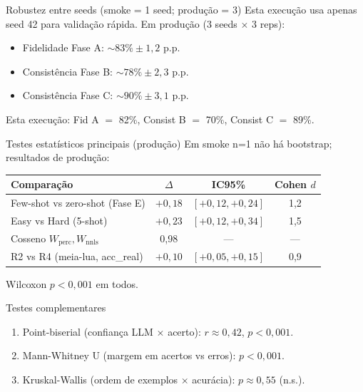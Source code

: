 \documentclass[aspectratio=169,10pt]{beamer}
\begin{document}
\begin{frame}{Robustez entre seeds (smoke = 1 seed; produ\c{c}\~ao = 3)}
  \scriptsize
  Esta execu\c{c}\~ao usa apenas seed 42 para valida\c{c}\~ao r\'apida. Em produ\c{c}\~ao (3 seeds $\times$ 3 reps):
  \begin{itemize}
    \item Fidelidade Fase A: $\sim 83\% \pm 1{,}2$ p.p.
    \item Consist\^encia Fase B: $\sim 78\% \pm 2{,}3$ p.p.
    \item Consist\^encia Fase C: $\sim 90\% \pm 3{,}1$ p.p.
  \end{itemize}
  \medskip

  Esta execu\c{c}\~ao: Fid A $=$ 82\%, Consist B $=$ 70\%, Consist C $=$ 89\%.
\end{frame}

\begin{frame}{Testes estat\'isticos principais (produ\c{c}\~ao)}
  \scriptsize
  Em smoke n=1 n\~ao h\'a bootstrap; resultados de produ\c{c}\~ao:
  \begin{center}
  \begin{tabular}{lccc}
    \toprule
    Compara\c{c}\~ao & $\Delta$ & IC95\% & Cohen $d$ \\
    \midrule
    Few-shot vs zero-shot (Fase E) & $+0{,}18$ & $[+0{,}12, +0{,}24]$ & 1{,}2 \\
    Easy vs Hard (5-shot)           & $+0{,}23$ & $[+0{,}12, +0{,}34]$ & 1{,}5 \\
    Cosseno $W_{\text{perc}}, W_{\text{nnls}}$ & 0{,}98 & --- & --- \\
    R2 vs R4 (meia-lua, acc\_real)   & $+0{,}10$ & $[+0{,}05, +0{,}15]$ & 0{,}9 \\
    \bottomrule
  \end{tabular}
  \end{center}
  Wilcoxon $p < 0{,}001$ em todos.
\end{frame}

\begin{frame}{Testes complementares}
  \footnotesize
  \begin{enumerate}
    \item Point-biserial (confian\c{c}a LLM $\times$ acerto): $r \approx 0{,}42$, $p<0{,}001$.
    \item Mann-Whitney U (margem em acertos vs erros): $p<0{,}001$.
    \item Kruskal-Wallis (ordem de exemplos $\times$ acur\'acia): $p \approx 0{,}55$ (n.s.).
  \end{enumerate}
\end{frame}
\end{document}
